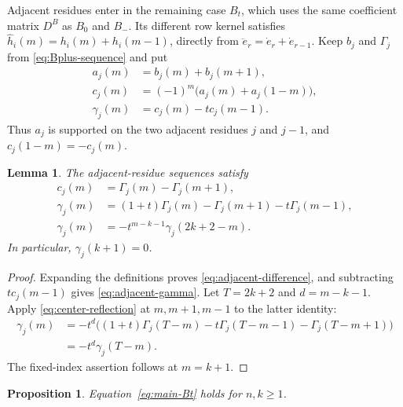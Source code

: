 \documentclass[12pt]{article}
\newtheorem{proposition}[theorem]{Proposition}
\newtheorem{lemma}[theorem]{Lemma}
\numberwithin{equation}{section}
\newcommand{\dote}{\dot e}
\newcommand{\ddote}{\ddot e}
\begin{document}
Adjacent residues enter in the remaining case $B_t$, which uses the
same coefficient matrix $D^B$ as $B_0$ and $B_-$.
Its different row kernel satisfies
$\widehat h_i(m)=h_i(m)+h_i(m-1)$, directly from
$\ddote_r=\dote_r+\dote_{r-1}$.
Keep $b_j$ and $\Gamma_j$ from \eqref{eq:Bplus-sequence} and put
\[
\begin{aligned}
 a_j(m)&=b_j(m)+b_j(m+1),\\
 c_j(m)&=(-1)^m\bigl(a_j(m)+a_j(1-m)\bigr),\\
 \gamma_j(m)&=c_j(m)-tc_j(m-1).
\end{aligned}
\]
Thus $a_j$ is supported on the two adjacent residues $j$ and $j-1$,
and $c_j(1-m)=-c_j(m)$.

\begin{lemma}
The adjacent-residue sequences satisfy
\begin{align}
 c_j(m)&=\Gamma_j(m)-\Gamma_j(m+1),\label{eq:adjacent-difference}\\
 \gamma_j(m)&=(1+t)\Gamma_j(m)-\Gamma_j(m+1)-t\Gamma_j(m-1),
 \label{eq:adjacent-gamma}\\
 \gamma_j(m)&=-t^{m-k-1}\gamma_j(2k+2-m).
 \label{eq:adjacent-reflection}
\end{align}
In particular, $\gamma_j(k+1)=0$.
\end{lemma}

\begin{proof}
Expanding the definitions proves \eqref{eq:adjacent-difference}, and
subtracting $tc_j(m-1)$ gives \eqref{eq:adjacent-gamma}.
Let $T=2k+2$ and $d=m-k-1$.  Apply
\eqref{eq:center-reflection} at $m,m+1,m-1$ to the latter identity:
\begin{align*}
 \gamma_j(m)
 &=-t^d\bigl((1+t)\Gamma_j(T-m)
             -t\Gamma_j(T-m-1)-\Gamma_j(T-m+1)\bigr)\\
 &=-t^d\gamma_j(T-m).
\end{align*}
The fixed-index assertion follows at $m=k+1$.
\end{proof}

\begin{proposition}
Equation~\eqref{eq:main-Bt} holds for $n,k\ge1$.
\end{proposition}
\end{document}
